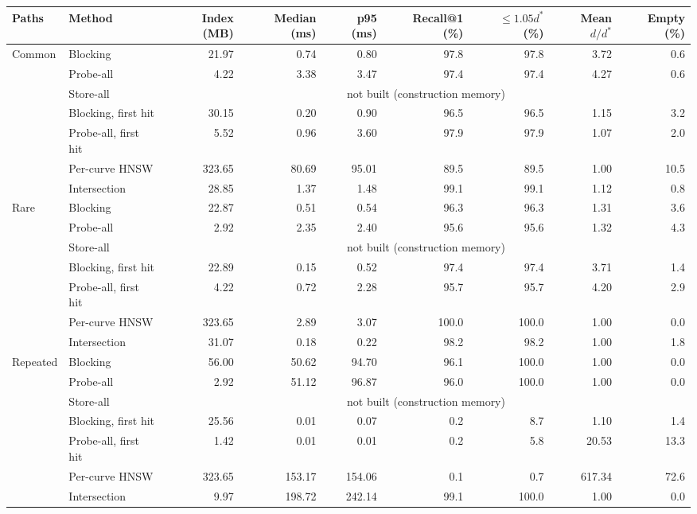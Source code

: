 \begin{tabular}{llrrrrrrr}
\toprule
Paths & Method & Index (MB) & Median (ms) & p95 (ms) & Recall@1 (\%) & $\le1.05d^*$ (\%) & Mean $d/d^*$ & Empty (\%)\\
\midrule
Common & Blocking & 21.97 & 0.74 & 0.80 & 97.8 & 97.8 & 3.72 & 0.6\\
 & Probe-all & 4.22 & 3.38 & 3.47 & 97.4 & 97.4 & 4.27 & 0.6\\
 & Store-all & \multicolumn{7}{c}{not built (construction memory)}\\
 & Blocking, first hit & 30.15 & 0.20 & 0.90 & 96.5 & 96.5 & 1.15 & 3.2\\
 & Probe-all, first hit & 5.52 & 0.96 & 3.60 & 97.9 & 97.9 & 1.07 & 2.0\\
 & Per-curve HNSW & 323.65 & 80.69 & 95.01 & 89.5 & 89.5 & 1.00 & 10.5\\
 & Intersection & 28.85 & 1.37 & 1.48 & 99.1 & 99.1 & 1.12 & 0.8\\\addlinespace[2pt]
Rare & Blocking & 22.87 & 0.51 & 0.54 & 96.3 & 96.3 & 1.31 & 3.6\\
 & Probe-all & 2.92 & 2.35 & 2.40 & 95.6 & 95.6 & 1.32 & 4.3\\
 & Store-all & \multicolumn{7}{c}{not built (construction memory)}\\
 & Blocking, first hit & 22.89 & 0.15 & 0.52 & 97.4 & 97.4 & 3.71 & 1.4\\
 & Probe-all, first hit & 4.22 & 0.72 & 2.28 & 95.7 & 95.7 & 4.20 & 2.9\\
 & Per-curve HNSW & 323.65 & 2.89 & 3.07 & 100.0 & 100.0 & 1.00 & 0.0\\
 & Intersection & 31.07 & 0.18 & 0.22 & 98.2 & 98.2 & 1.00 & 1.8\\\addlinespace[2pt]
Repeated & Blocking & 56.00 & 50.62 & 94.70 & 96.1 & 100.0 & 1.00 & 0.0\\
 & Probe-all & 2.92 & 51.12 & 96.87 & 96.0 & 100.0 & 1.00 & 0.0\\
 & Store-all & \multicolumn{7}{c}{not built (construction memory)}\\
 & Blocking, first hit & 25.56 & 0.01 & 0.07 & 0.2 & 8.7 & 1.10 & 1.4\\
 & Probe-all, first hit & 1.42 & 0.01 & 0.01 & 0.2 & 5.8 & 20.53 & 13.3\\
 & Per-curve HNSW & 323.65 & 153.17 & 154.06 & 0.1 & 0.7 & 617.34 & 72.6\\
 & Intersection & 9.97 & 198.72 & 242.14 & 99.1 & 100.0 & 1.00 & 0.0\\
\bottomrule
\end{tabular}
